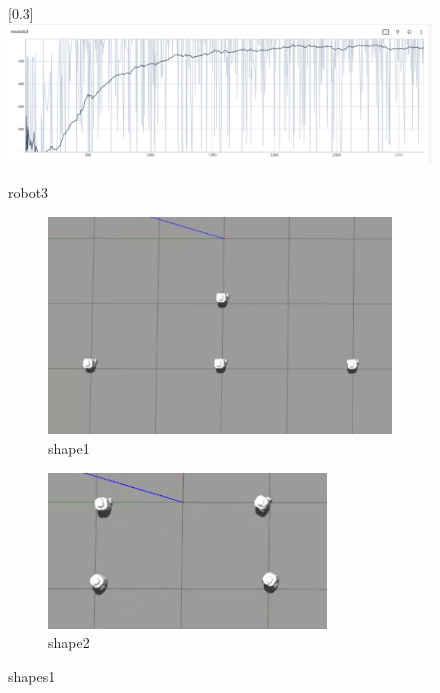 \documentclass[12pt]{extarticle}
\begin{document}
\begin{figure}[h]  

\scalebox{0.3}[0.3]{
\includegraphics{robot3}
}

\caption[robot3]{robot3}


\end{figure}




\begin{figure}
\centering
\begin{subfigure}{.5\textwidth}
  \centering
  \includegraphics[width=.9\linewidth]{shape1}
  \caption{shape1}
  \label{fig:sub1}
\end{subfigure}%
\begin{subfigure}{.5\textwidth}
  \centering
  \includegraphics[width=.9\linewidth]{shape2}
  \caption{shape2}
  \label{fig:sub2}
\end{subfigure}
\caption{shapes1}
\label{fig:test}



\end{figure}
\end{document}
